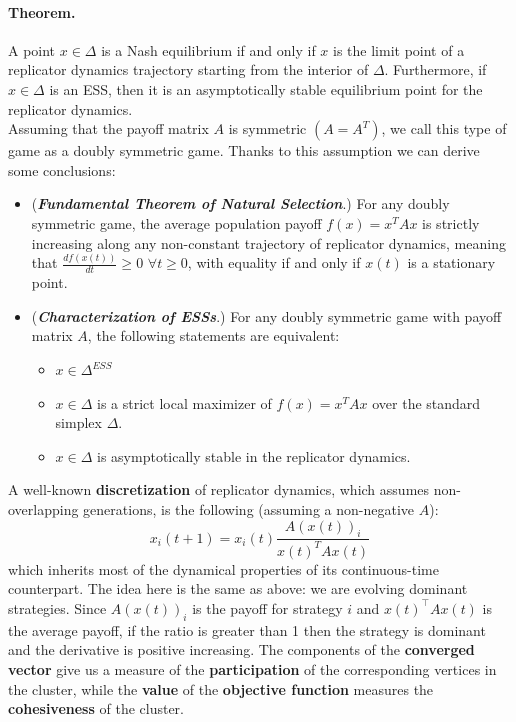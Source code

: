 \paragraph{Theorem.} A point $x\in\Delta$ is a Nash equilibrium if and only if $x$ is the limit point of a replicator dynamics trajectory starting from the interior of $\Delta$.
Furthermore, if $x\in\Delta$ is an ESS, then it is an asymptotically stable equilibrium point for the replicator dynamics.\\

Assuming that the payoff matrix $A$ is symmetric $(A = A^T)$, we call this type of game as a doubly symmetric game. Thanks to this assumption we can derive some conclusions:
\begin{itemize}
	\item (\textbf{\textit{Fundamental Theorem of Natural Selection}}.) For any doubly symmetric game, the average population payoff $f(x) = x^TAx$ is strictly increasing along any non-constant trajectory of replicator dynamics, meaning that $\frac{df(x(t))}{dt} \geq 0$ $\forall t \geq0$, with equality if and only if $x(t)$ is a stationary point.
	\item (\textit{\textbf{Characterization of ESSs}}.) For any doubly symmetric game with payoff matrix $A$, the following statements are equivalent:
	\begin{itemize}
		\item $x\in \Delta^{ESS}$
		\item $x \in \Delta$ is a strict local maximizer of $f(x) = x^TAx$ over the standard simplex $\Delta$.
		\item $x\in\Delta$ is asymptotically stable in the replicator dynamics.
	\end{itemize}
\end{itemize}


A well-known \textbf{discretization} of replicator dynamics, which assumes non-overlapping generations, is the following (assuming a non-negative $A$): 
$$
x_i(t+1) = x_i(t)\frac{A(x(t))_i}{x(t)^TAx(t)}
$$
which inherits most of the dynamical properties of its continuous-time counterpart. The idea here is the same as above: we are evolving dominant strategies. Since $A(x(t))_i$ is the payoff for strategy $i$ and $x(t)^\top Ax(t)$ is the average payoff, if the ratio is greater than 1 then the strategy is dominant and the derivative is positive increasing.
The components of the \textbf{converged vector} give us a measure of the \textbf{participation} of the corresponding vertices in the cluster, while the \textbf{value} of the \textbf{objective function} measures the \textbf{cohesiveness} of the cluster.

